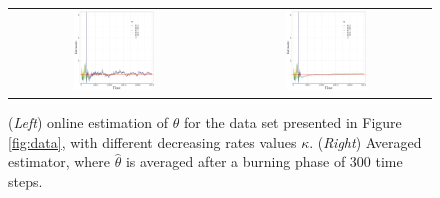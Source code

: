 \documentclass{article}
\newcommand{\parvec}{\theta}
\begin{document}
\begin{figure}
\centering
\begin{tabular}{cc}
\includegraphics[width = 0.4\textwidth]{oneObs_oneStart_severalGrads.pdf}&
\includegraphics[width = 0.4\textwidth]{oneObs_oneStart_severalGrads_smooth.pdf}
\end{tabular}
\caption{\label{fig:1obs:1start:6Grads}(\textit{Left}) online estimation of $\theta$ for the data set presented in Figure \ref{fig:data}, with different decreasing rates values $\kappa$. (\textit{Right}) Averaged estimator, where $\hat{\parvec}$ is averaged after a burning phase of 300 time steps.}
\end{figure}
\end{document}
